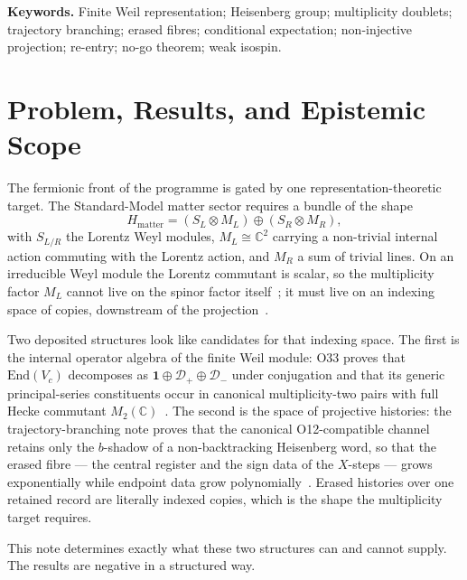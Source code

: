 \documentclass[11pt,a4paper]{article}
\theoremstyle{definition}
\theoremstyle{remark}
\newcommand{\C}{\mathbb{C}}
\newcommand{\End}{\mathrm{End}}
\newcommand{\Id}{\mathbf{1}}
\newcommand{\Dplus}{\mathcal{D}_{+}}
\newcommand{\Dminus}{\mathcal{D}_{-}}
\newcommand{\Vc}{V_{c}}
\begin{document}
\noindent\textbf{Keywords.}
Finite Weil representation; Heisenberg group; multiplicity doublets; trajectory
branching; erased fibres; conditional expectation; non-injective projection; re-entry;
no-go theorem; weak isospin.

\newpage
\tableofcontents

\newpage
\section{Problem, Results, and Epistemic Scope}
\label{sec:introduction}

The fermionic front of the programme is gated by one representation-theoretic target.
The Standard-Model matter sector requires a bundle of the shape
\[
  H_{\mathrm{matter}}=(S_L\otimes M_L)\oplus(S_R\otimes M_R),
\]
with $S_{L/R}$ the Lorentz Weyl modules, $M_L\cong\C^2$ carrying a non-trivial internal
action commuting with the Lorentz action, and $M_R$ a sum of trivial lines.
On an irreducible Weyl module the Lorentz commutant is scalar, so the multiplicity factor
$M_L$ cannot live on the spinor factor itself~\cite{Beau2026q14}; it must live on an
indexing space of copies, downstream of the projection~\cite{Beau2026m}.

Two deposited structures look like candidates for that indexing space.
The first is the internal operator algebra of the finite Weil module: O33 proves that
$\End(\Vc)$ decomposes as $\Id\oplus\Dplus\oplus\Dminus$ under conjugation and that its
generic principal-series constituents occur in canonical multiplicity-two pairs with full
Hecke commutant $M_2(\C)$~\cite{Beau2026a37}.
The second is the space of projective histories: the trajectory-branching note proves
that the canonical O12-compatible channel retains only the $b$-shadow of a
non-backtracking Heisenberg word, so that the erased fibre --- the central register and
the sign data of the $X$-steps --- grows exponentially while endpoint data grow
polynomially~\cite{Beau2026tb}.
Erased histories over one retained record are literally indexed copies, which is the
shape the multiplicity target requires.

This note determines exactly what these two structures can and cannot supply.
The results are negative in a structured way.
\end{document}

